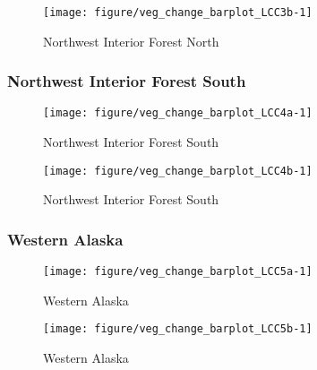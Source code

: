 \documentclass{article}\usepackage[]{graphicx}\usepackage[]{color}
\makeatletter
\def\maxwidth{ %
  \ifdim\Gin@nat@width>\linewidth
    \linewidth
  \else
    \Gin@nat@width
  \fi
}
\makeatother
\begin{document}
\begin{figure}[H]
\texttt{[image: figure/veg\_change\_barplot\_LCC3b-1]} \caption[Northwest Interior Forest North]{Northwest Interior Forest North}\label{fig:veg_change_barplot_LCC3b}
\end{figure}



\subsubsection{Northwest Interior Forest South}
\begin{figure}[H]
\texttt{[image: figure/veg\_change\_barplot\_LCC4a-1]} \caption[Northwest Interior Forest South]{Northwest Interior Forest South}\label{fig:veg_change_barplot_LCC4a}
\end{figure}


\begin{figure}[H]
\texttt{[image: figure/veg\_change\_barplot\_LCC4b-1]} \caption[Northwest Interior Forest South]{Northwest Interior Forest South}\label{fig:veg_change_barplot_LCC4b}
\end{figure}



\subsubsection{Western Alaska}
\begin{figure}[H]
\texttt{[image: figure/veg\_change\_barplot\_LCC5a-1]} \caption[Western Alaska]{Western Alaska}\label{fig:veg_change_barplot_LCC5a}
\end{figure}


\begin{figure}[H]
\texttt{[image: figure/veg\_change\_barplot\_LCC5b-1]} \caption[Western Alaska]{Western Alaska}\label{fig:veg_change_barplot_LCC5b}
\end{figure}
\end{document}
